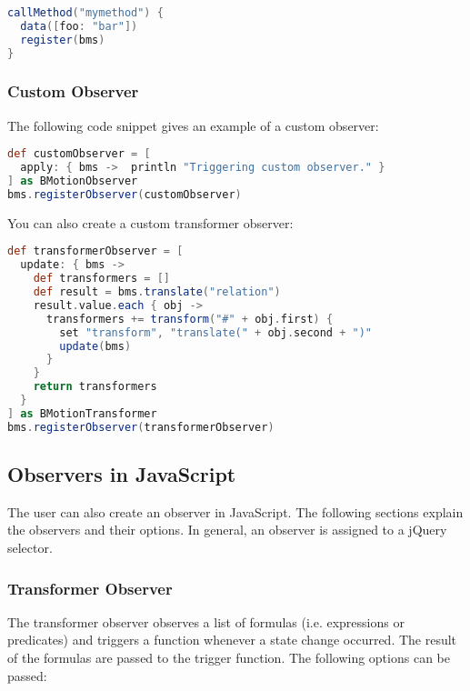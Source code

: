\begin{lstlisting}[float=ht,language=Groovy]
callMethod("mymethod") {
  data([foo: "bar"])
  register(bms)
}
\end{lstlisting}

\subsubsection{Custom Observer}
\label{sec:custom_observers}

The following code snippet gives an example of a custom observer:
\begin{lstlisting}[float=ht,language=Groovy]
def customObserver = [ 
  apply: { bms ->  println "Triggering custom observer." } 
] as BMotionObserver
bms.registerObserver(customObserver)
\end{lstlisting}

You can also create a custom transformer observer:
\begin{lstlisting}[float=ht,language=Groovy]
def transformerObserver = [
  update: { bms ->
    def transformers = []
    def result = bms.translate("relation")					
    result.value.each { obj ->
      transformers += transform("#" + obj.first) {
        set "transform", "translate(" + obj.second + ")"
        update(bms)
      }
    }
    return transformers
  }
] as BMotionTransformer
bms.registerObserver(transformerObserver)
\end{lstlisting}

\subsection{Observers in JavaScript}
\label{sec:js_observers}

The user can also create an observer in JavaScript.
The following sections explain the observers and their options.
In general, an observer is assigned to a jQuery selector.

\subsubsection{Transformer Observer}

The transformer observer observes a list of formulas (i.e. expressions or predicates) and triggers a function whenever a state change occurred.
The result of the formulas are passed to the trigger function.
The following options can be passed:

